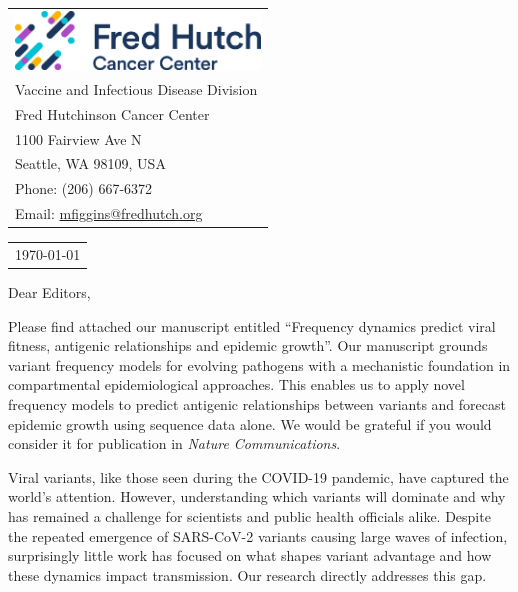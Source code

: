 \documentclass[11pt]{article}
\begin{document}
\thispagestyle{empty} %

\mbox{}\hfill
\begin{tabular}{l @{}}
	\includegraphics[width=6.5cm]{figures/fhcrc_logo} \\
	Vaccine and Infectious Disease Division \\
	Fred Hutchinson Cancer Center \\
	1100 Fairview Ave N \\
	Seattle, WA 98109, USA \\
	Phone: (206) 667-6372 \\
	Email: \href{mailto:mfiggins@fredhutch.org}{mfiggins@fredhutch.org} \\
\end{tabular}

\vspace{0.1in} %

\begin{tabular}{@{} l}
  \today
\end{tabular}

\vspace{0.1in} %

Dear Editors,

\medskip %

Please find attached our manuscript entitled ``Frequency dynamics predict viral fitness, antigenic relationships and epidemic growth''.
Our manuscript grounds variant frequency models for evolving pathogens with a mechanistic foundation in compartmental epidemiological approaches.
This enables us to apply novel frequency models to predict antigenic relationships between variants and forecast epidemic growth using sequence data alone.
We would be grateful if you would consider it for publication in \textit{Nature Communications}.

Viral variants, like those seen during the COVID-19 pandemic, have captured the world’s attention.
However, understanding which variants will dominate and why has remained a challenge for scientists and public health officials alike.
Despite the repeated emergence of SARS-CoV-2 variants causing large waves of infection, surprisingly little work has focused on what shapes variant advantage and how these dynamics impact transmission.
Our research directly addresses this gap.
\end{document}

